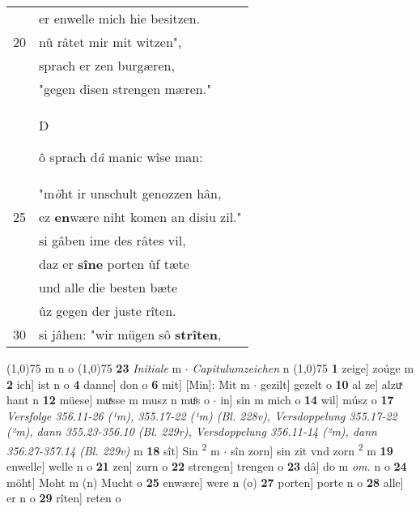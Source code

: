 \documentclass[8pt,a4paper,notitlepage]{article}
\begin{document}
\begin{table}[ht]
\begin{minipage}[t]{0.5\linewidth}
\begin{tabular}{rl}
 & er enwelle mich hie besitzen.\\ 
20 & nû râtet mir mit witzen",\\ 
 & sprach er zen burgæren,\\ 
 & "gegen disen strengen mæren."\\ 
 & \begin{large}D\end{large}ô sprach d\textit{â} manic wîse man:\\ 
 & "m\textit{ö}ht ir unschult genozzen hân,\\ 
25 & ez \textbf{en}wære niht komen an disiu zil."\\ 
 & si gâben ime des râtes vil,\\ 
 & daz er \textbf{sîne} porten ûf tæte\\ 
 & und alle die besten bæte\\ 
 & ûz gegen der juste rîten.\\ 
30 & si jâhen: "wir mügen sô \textbf{strîten},\\ 
\end{tabular}
\scriptsize
\line(1,0){75} \newline
m n o \newline
\line(1,0){75} \newline
\textbf{23} \textit{Initiale} m   $\cdot$ \textit{Capitulumzeichen} n  \newline
\line(1,0){75} \newline
\textbf{1} zeige] zoúge m \textbf{2} ich] ist n o \textbf{4} danne] don o \textbf{6} mit] [Min]: Mit m  $\cdot$ gezilt] gezelt o \textbf{10} al ze] alzuͯ hant n \textbf{12} müese] muͯsse m musz n muͦs o  $\cdot$ in] sin m mich o \textbf{14} wil] músz o \textbf{17} \textit{Versfolge 356.11-26 (¹m), 355.17-22 (¹m) (Bl. 228v), Versdoppelung 355.17-22 (²m), dann 355.23-356.10 (Bl. 229r), Versdoppelung 356.11-14 (²m), dann 356.27-357.14 (Bl. 229v)} m  \textbf{18} sît] Sin \textsuperscript{2}\hspace{-1.3mm} m  $\cdot$ sîn zorn] sin zit vnd zorn \textsuperscript{2}\hspace{-1.3mm} m \textbf{19} enwelle] welle n o \textbf{21} zen] zurn o \textbf{22} strengen] trengen o \textbf{23} dâ] do m \textit{om.} n o \textbf{24} möht] Moht m (n) Mucht o \textbf{25} enwære] were n (o) \textbf{27} porten] porte n o \textbf{28} alle] er n o \textbf{29} rîten] reten o \newline
\end{minipage}
\end{table}
\newpage
\end{document}
